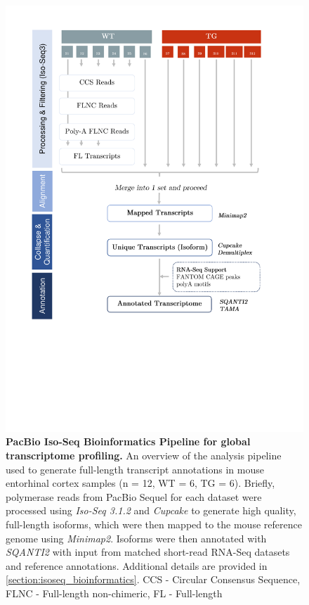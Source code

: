 \begin{figure}[htp]
	\centering
	\vspace{20pt}
	\includegraphics[page=1,trim={0 7cm 2cm 1cm},clip, scale = 0.7]{Figures/WholeTranscriptome_Figures.pdf}
	\captionsetup{width=0.95\textwidth}
	\caption[PacBio Iso-Seq Bioinformatics Pipeline for global transcriptome profiling]%
	{\textbf{PacBio Iso-Seq Bioinformatics Pipeline for global transcriptome profiling.} An overview of the analysis pipeline used to generate full-length transcript annotations in mouse entorhinal cortex samples (n = 12, WT = 6, TG = 6). Briefly, polymerase reads from PacBio Sequel for each dataset were processed using \textit{Iso-Seq 3.1.2} and \textit{Cupcake} to generate high quality, full-length isoforms, which were then mapped to the mouse reference genome using \textit{Minimap2}. Isoforms were then annotated with \textit{SQANTI2} with input from matched short-read RNA-Seq datasets and reference annotations. Additional details are provided in \cref{section:isoseq_bioinformatics}. CCS - Circular Consensus Sequence, FLNC - Full-length non-chimeric, FL - Full-length}
	\label{fig:isoseq_whole_pipeline}
\end{figure}
 

